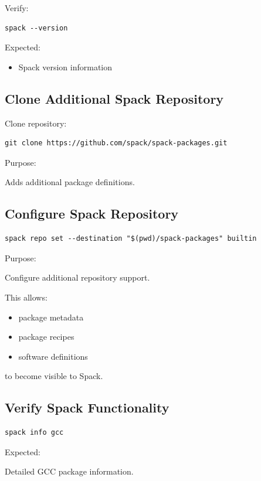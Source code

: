 \documentclass[11pt]{article}
\begin{document}
Verify:

\begin{verbatim}
spack --version
\end{verbatim}

Expected:
\begin{itemize}
\item Spack version information
\end{itemize}
\subsection{Clone Additional Spack Repository}
\label{sec:orgf2271f5}

Clone repository:

\begin{verbatim}
git clone https://github.com/spack/spack-packages.git
\end{verbatim}

Purpose:

Adds additional package definitions.
\subsection{Configure Spack Repository}
\label{sec:org12becf3}

\begin{verbatim}
spack repo set --destination "$(pwd)/spack-packages" builtin
\end{verbatim}

Purpose:

Configure additional repository support.

This allows:

\begin{itemize}
\item package metadata
\item package recipes
\item software definitions
\end{itemize}

to become visible to Spack.
\subsection{Verify Spack Functionality}
\label{sec:orgccddae1}

\begin{verbatim}
spack info gcc
\end{verbatim}

Expected:

Detailed GCC package information.
\end{document}

